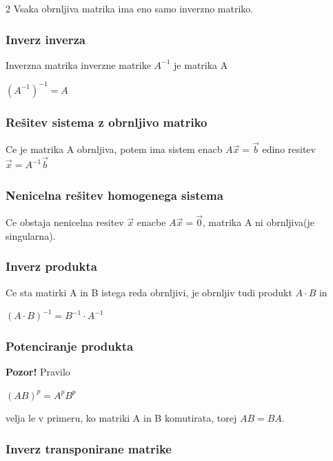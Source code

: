 \documentclass{article}
\begin{document}
\begin{multicols}{2}
	Vsaka obrnljiva matrika ima eno samo inverzno matriko.

	\subsubsection{Inverz inverza}

	Inverzna matrika inverzne matrike $A^{-1}$ je matrika A
	\begin{center}
		$(A^{-1})^{-1} = A$
	\end{center}

	\subsubsection{Rešitev sistema z obrnljivo matriko}

	Ce je matrika A obrnljiva, potem ima sistem enacb
	$A\vec{x} = \vec{b}$ edino resitev $\vec{x} = A^{-1} \vec{b}$

	\subsubsection{Nenicelna rešitev homogenega sistema}

	Ce obstaja nenicelna resitev $\vec{x}$ enacbe $A\vec{x} = \vec{0}$,
	matrika A ni obrnljiva(je singularna).

	\subsubsection{Inverz produkta}

	Ce sta matirki A in B istega reda obrnljivi, je obrnljiv tudi
	produkt $A \cdot B$ in
	\begin{center}
		$(A \cdot B)^{-1} =
			B^{-1} \cdot A^{-1}
		$
	\end{center}

	\subsubsection{Potenciranje produkta}

	\textbf{Pozor!} Pravilo
	\begin{center}
		$(AB)^{p} = A^{p}B^{p}$
	\end{center}
	velja le v primeru, ko matriki A in B komutirata, torej $AB = BA$.

	\subsubsection{Inverz transponirane matrike}


\end{multicols}
\end{document}
